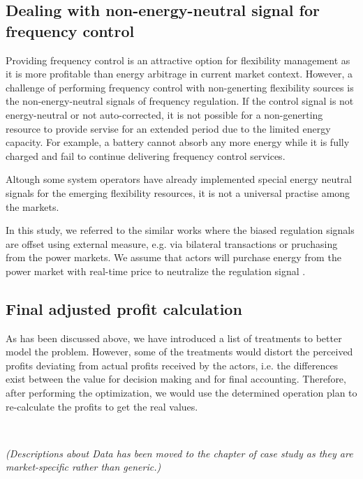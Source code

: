 \subsection{Dealing with non-energy-neutral signal for frequency control}
Providing frequency control is an attractive option for flexibility management as it is more profitable than energy arbitrage in current market context. However, a challenge of performing frequency control with non-generting flexibility sources is the non-energy-neutral signals of frequency regulation. If the control signal is not energy-neutral or not auto-corrected, it is not possible for a non-generting resource to provide servise for an extended period due to the limited energy capacity. For example, a battery cannot absorb any more energy while it is fully charged and fail to continue delivering frequency control services.

Altough some system operators have already implemented special energy neutral signals for the emerging flexibility resources, it is not a universal practise among the markets. 

In this study, we referred to the similar works \cite{Megel2017}\cite{Oudalov2007}\cite{Borsche2013}\cite{Jin2014} where the biased regulation signals are offset using external measure, e.g. via bilateral transactions or pruchasing from the power markets. We assume that actors will purchase energy from the power market with real-time price to neutralize the regulation signal . 

\subsection{Final adjusted profit calculation}
As has been discussed above, we have introduced a list of treatments to better model the problem. However, some of the treatments would distort the perceived profits deviating from actual profits received by the actors, i.e. the differences exist between the value for decision making and for final accounting. Therefore, after performing the optimization, we would use the determined operation plan to re-calculate the profits to get the real values. 

~\newline

\textit{(Descriptions about Data has been moved to the chapter of case study as they are market-specific rather than generic.)}

